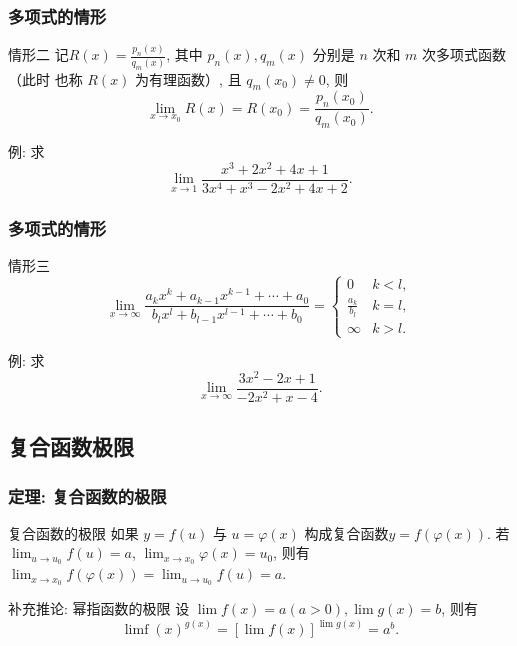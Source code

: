 \documentclass[
10pt,  
aspectratio=43,  
]{beamer}
\begin{document}
\begin{frame}
	\frametitle{多项式的情形}
	
	\begin{exampleblock}{情形二}
		记$R(x)=\displaystyle\frac{p_n(x)}{q_m(x)}$,   其中 $p_n(x),   q_m(x)$ 分别是 $n$ 次和 $m$ 次多项式函数（此时 也称 $R(x)$ 为有理函数）,  且 $q_m\left(x_0\right) \neq 0$,   则
		$$\lim _{x \rightarrow x_0} R(x)=R\left(x_0\right)=\frac{p_n\left(x_0\right)}{q_m\left(x_0\right)}.$$
	\end{exampleblock}
	例:  求 $$\lim _{x \rightarrow 1} \frac{x^3+2 x^2+4 x+1}{3 x^4+x^3-2 x^2+4 x+2}.$$
	
\end{frame}

\begin{frame}
	\frametitle{多项式的情形}
	
	\begin{exampleblock}{情形三}
		$$
		\lim _{x \rightarrow \infty} \frac{a_k x^k+a_{k-1} x^{k-1}+\cdots+a_0}{b_l x^{l}+b_{l-1} x^{l-1}+\cdots+b_0}=\left\{\begin{array}{cc}
		0 & k<l,   \\
		\displaystyle\frac{a_k}{b_l} & k=l,   \\
		\infty & k>l.
		\end{array}\right.
		$$
	\end{exampleblock}
	例:  求 $$\displaystyle\lim_{x \rightarrow \infty} \frac{3 x^2-2 x+1}{-2 x^2+x-4}.$$
\end{frame}

\subsection{复合函数极限}

\begin{frame}
	\frametitle{定理: 复合函数的极限}
	
	\begin{block}{复合函数的极限}
		如果 $y=f(u)$ 与 $u=\varphi(x)$ 构成复合函数$y=f(\varphi(x))$. 若 $\lim _{u \rightarrow u_0} f(u)=a$,   $\lim _{x \rightarrow x_0} \varphi(x)=u_0$,   则有 $\lim _{x \rightarrow x_0} f(\varphi(x))=\lim _{u \rightarrow u_0} f(u)=a$.
	\end{block}
	\pause
	\begin{exampleblock}{补充推论: 幂指函数的极限}
		设 $\lim f(x)=a(a>0),   \lim g(x)=b$,   则有
		$$
		\operatorname{limf}(x)^{g(x)}=[\lim f(x)]^{\lim g(x)}=a^b.
		$$
	\end{exampleblock}
\end{frame}
\end{document}
